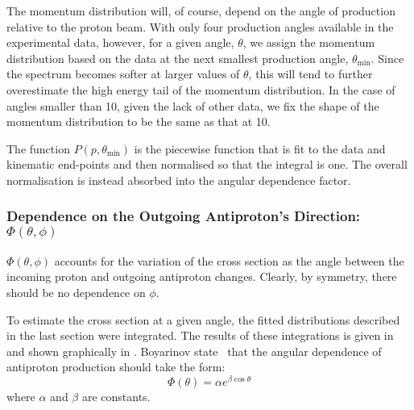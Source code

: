 The momentum distribution will, of course, depend on the angle of production relative to the proton beam.
With only four production angles available in the experimental data, however, for a given angle, $\theta$, we assign the momentum distribution based on the data at the next smallest production angle, $\theta_\textrm{min}$.
Since the spectrum becomes softer at larger values of $\theta$, this will tend to further overestimate the high energy tail of the momentum distribution.
In the case of angles smaller than 10\degree, given the lack of other data, we fix the  shape of the momentum distribution to be the same as that at 10\degree.

The function $P(p,\theta_\textrm{min})$ is the piecewise function that is fit to the data and kinematic end-points and then normalised so that the integral is one.
The overall normalisation is instead absorbed into the angular dependence factor.

\subsubsection*{Dependence on the Outgoing Antiproton's Direction: $\Phi(\theta,\phi)$}
\TabAntiprotonRegions
\FigAntiprotonAngularDependence
$\Phi(\theta,\phi)$ accounts for the variation of the cross section as the angle between the incoming proton and outgoing antiproton changes.
Clearly, by symmetry, there should be no dependence on $\phi$.

To estimate the cross section at a given angle, the fitted distributions described in the last section were integrated.
The results of these integrations is given in  and shown graphically in .
Boyarinov \etal state~\cite{Boyarinov:1994tp} that the angular dependence of antiproton production should take the form:
\begin{equation}
\Phi(\theta)=\alpha e^{\beta\cos\theta}
\end{equation}
where $\alpha$ and $\beta$ are constants. 

